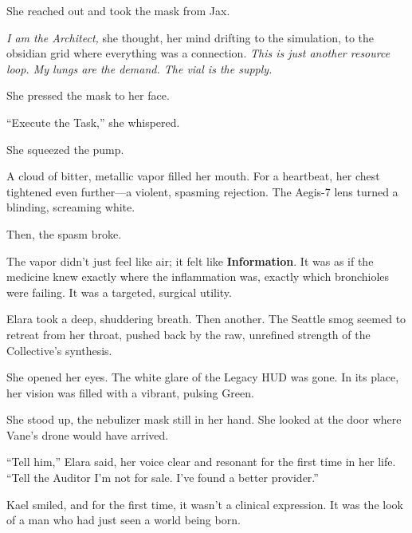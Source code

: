 She reached out and took the mask from Jax. 

\textit{I am the Architect,} she thought, her mind drifting to the simulation, to the obsidian grid where everything was a connection. \textit{This is just another resource loop. My lungs are the demand. The vial is the supply.}

She pressed the mask to her face. 

``Execute the Task,'' she whispered. 

She squeezed the pump. 

A cloud of bitter, metallic vapor filled her mouth. For a heartbeat, her chest tightened even further—a violent, spasming rejection. The Aegis-7 lens turned a blinding, screaming white. 


Then, the spasm broke. 

The vapor didn't just feel like air; it felt like \textbf{Information}. It was as if the medicine knew exactly where the inflammation was, exactly which bronchioles were failing. It was a targeted, surgical utility. 

Elara took a deep, shuddering breath. Then another. The Seattle smog seemed to retreat from her throat, pushed back by the raw, unrefined strength of the Collective’s synthesis. 

She opened her eyes. The white glare of the Legacy HUD was gone. In its place, her vision was filled with a vibrant, pulsing Green. 


She stood up, the nebulizer mask still in her hand. She looked at the door where Vane’s drone would have arrived. 

``Tell him,'' Elara said, her voice clear and resonant for the first time in her life. ``Tell the Auditor I'm not for sale. I've found a better provider.''

Kael smiled, and for the first time, it wasn't a clinical expression. It was the look of a man who had just seen a world being born.

